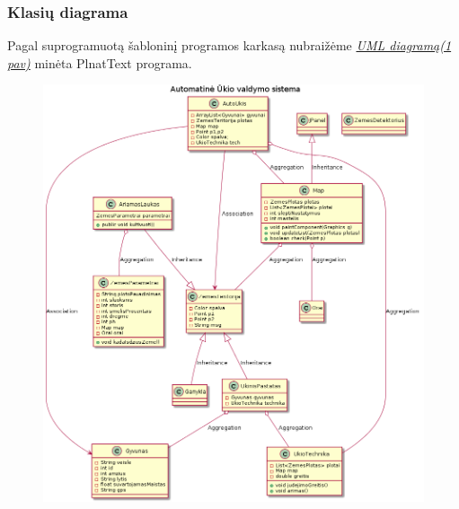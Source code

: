 \documentclass[oneside]{VUMIFPSkursinis}
\begin{document}
\subsubsection{Klasių diagrama}
Pagal suprogramuotą šabloninį programos karkasą nubraižėme  \hyperref[fig:uml]{\textit{ UML diagramą(1 pav)}} minėta PlnatText programa.
	\begin{figure}[H]	
	\centering	
		\includegraphics[width=\textwidth,height=\textheight,keepaspectratio]{uml.png}	
		\caption{}
		\label{fig:uml}
	\end{figure}
\end{document}
